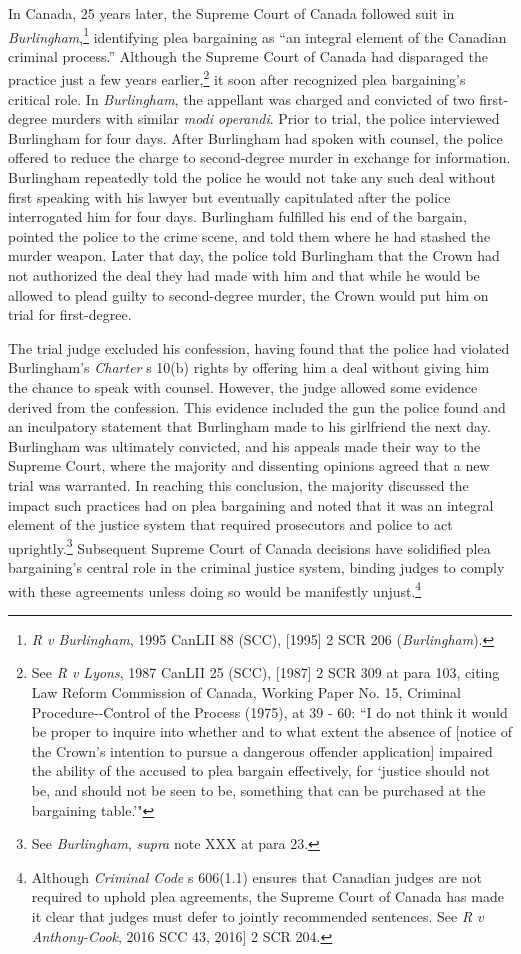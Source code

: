 In Canada, 25 years later, the Supreme Court of Canada followed suit in \textit{Burlingham},\footnote{\textit{R v Burlingham}, 1995 CanLII 88 (SCC), [1995] 2 SCR 206 (\textit{Burlingham}).} identifying plea bargaining as ``an integral element of the Canadian criminal process.'' Although the Supreme Court of Canada had disparaged the practice just a few years earlier,\footnote{See \textit{R v Lyons}, 1987 CanLII 25 (SCC), [1987] 2 SCR 309 at para 103, citing Law Reform Commission of Canada, Working Paper No. 15, Criminal Procedure‑‑Control of the Process (1975), at 39 - 60: ``I do not think it would be proper to inquire into whether and to what extent the absence of [notice of the Crown's intention to pursue a dangerous offender application] impaired the ability of the accused to plea bargain effectively, for `justice should not be, and should not be seen to be, something that can be purchased at the bargaining table.'"} it soon after recognized plea bargaining's critical role. In \textit{Burlingham}, the appellant was charged and convicted of two first-degree murders with similar \textit{modi operandi}. Prior to trial, the police interviewed Burlingham for four days. After Burlingham had spoken with counsel, the police offered to reduce the charge to second-degree murder in exchange for information. Burlingham repeatedly told the police he would not take any such deal without first speaking with his lawyer but eventually capitulated after the police interrogated him for four days. Burlingham fulfilled his end of the bargain, pointed the police to the crime scene, and told them where he had stashed the murder weapon. Later that day, the police told Burlingham that the Crown had not authorized the deal they had made with him and that while he would be allowed to plead guilty to second-degree murder, the Crown would put him on trial for first-degree.

The trial judge excluded his confession, having found that the police had violated Burlingham's \textit{Charter} s 10(b) rights by offering him a deal without giving him the chance to speak with counsel. However, the judge allowed some evidence derived from the confession. This evidence included the gun the police found and an inculpatory statement that Burlingham made to his girlfriend the next day. Burlingham was ultimately convicted, and his appeals made their way to the Supreme Court, where the majority and dissenting opinions agreed that a new trial was warranted. In reaching this conclusion, the majority discussed the impact such practices had on plea bargaining and noted that it was an integral element of the justice system that required prosecutors and police to act uprightly.\footnote{See \textit{Burlingham}, \textit{supra} note XXX at para 23.} Subsequent Supreme Court of Canada decisions have solidified plea bargaining's central role in the criminal justice system, binding judges to comply with these agreements unless doing so would be manifestly unjust.\footnote{Although \textit{Criminal Code} s 606(1.1) ensures that Canadian judges are not required to uphold plea agreements, the Supreme Court of Canada has made it clear that judges must defer to jointly recommended sentences. See \textit{R v Anthony-Cook}, 2016 SCC 43, 2016] 2 SCR 204.}

